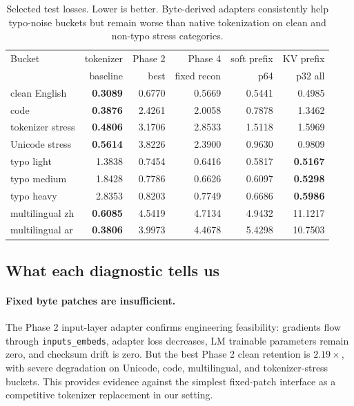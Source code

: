 \documentclass{article}
\begin{document}
\begin{table}[t]
\centering
\small
\setlength{\tabcolsep}{4.2pt}
\begin{tabular}{lrrrrr}
\toprule
Bucket & tokenizer & Phase 2 & Phase 4 & soft prefix & KV prefix \\
 & baseline & best & fixed recon & p64 & p32 all \\
\midrule
clean English & \textbf{0.3089} & 0.6770 & 0.5669 & 0.5441 & 0.4985 \\
code & \textbf{0.3876} & 2.4261 & 2.0058 & 0.7878 & 1.3462 \\
tokenizer stress & \textbf{0.4806} & 3.1706 & 2.8533 & 1.5118 & 1.5969 \\
Unicode stress & \textbf{0.5614} & 3.8226 & 2.3900 & 0.9630 & 0.9809 \\
typo light & 1.3838 & 0.7454 & 0.6416 & 0.5817 & \textbf{0.5167} \\
typo medium & 1.8428 & 0.7786 & 0.6626 & 0.6097 & \textbf{0.5298} \\
typo heavy & 2.8353 & 0.8203 & 0.7749 & 0.6686 & \textbf{0.5986} \\
multilingual zh & \textbf{0.6085} & 4.5419 & 4.7134 & 4.9432 & 11.1217 \\
multilingual ar & \textbf{0.3806} & 3.9973 & 4.4678 & 5.4298 & 10.7503 \\
\bottomrule
\end{tabular}
\caption{Selected test losses. Lower is better. Byte-derived adapters consistently help typo-noise buckets but remain worse than native tokenization on clean and non-typo stress categories.}
\label{tab:buckets}
\end{table}

\subsection{What each diagnostic tells us}

\paragraph{Fixed byte patches are insufficient.}
The Phase 2 input-layer adapter confirms engineering feasibility: gradients flow through \texttt{inputs\_embeds}, adapter loss decreases, LM trainable parameters remain zero, and checksum drift is zero. But the best Phase 2 clean retention is $2.19\times$, with severe degradation on Unicode, code, multilingual, and tokenizer-stress buckets. This provides evidence against the simplest fixed-patch interface as a competitive tokenizer replacement in our setting.
\end{document}
